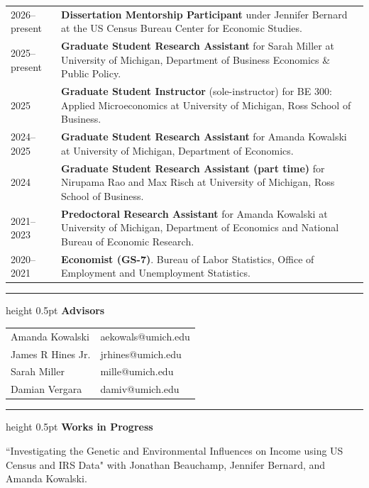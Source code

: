 \documentclass[a4paper,11pt]{article}
\newcommand{\CVSection}[1]{%
  \vspace{1.5em}
  \hrule height 0.5pt
  \vspace{0.8em}
  \noindent\textbf{#1}
  \vspace{0.5em}\par
}
\begin{document}
\begin{tabularx}{\linewidth}{@{}lX@{}}
2026--present     & \textbf{Dissertation Mentorship Participant} under Jennifer Bernard at the US Census Bureau Center for Economic Studies. \\
2025--present     & \textbf{Graduate Student Research Assistant} for Sarah Miller at University of Michigan, Department of Business Economics \& Public Policy. \\ 
2025 & \textbf{Graduate Student Instructor} (sole-instructor) for BE 300: Applied Microeconomics at University of Michigan, Ross School of Business. \\
 2024--2025    & \textbf{Graduate Student Research Assistant} for Amanda Kowalski at University of Michigan, Department of Economics. \\
 2024             & \textbf{Graduate Student Research Assistant (part time)} for Nirupama Rao and Max Risch at University of Michigan, Ross School of Business. \\ 
 2021--2023       & \textbf{Predoctoral Research Assistant} for Amanda Kowalski at University of Michigan, Department of Economics and National Bureau of Economic Research. \\ 
2020--2021        & \textbf{Economist (GS-7)}. Bureau of Labor Statistics, Office of Employment and Unemployment Statistics.
\end{tabularx}

\CVSection{Advisors}
\begin{tabular}{ll}
     Amanda Kowalski & aekowals@umich.edu \\ 
     James R Hines Jr. & jrhines@umich.edu \\ 
     Sarah Miller & mille@umich.edu  \\ 
     Damian Vergara & damiv@umich.edu 
\end{tabular}

\CVSection{Works in Progress}

``Investigating the Genetic and Environmental Influences on Income using US Census and IRS Data" with Jonathan Beauchamp, Jennifer Bernard, and Amanda Kowalski.
\end{document}
